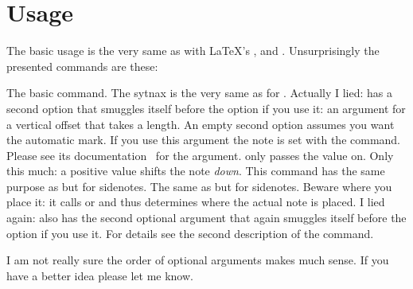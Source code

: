 \documentclass[toc=index,toc=bib,mpinclude]{cnpkgdoc}
\begin{document}
\section{Usage}
The basic usage is the very same as with \LaTeX's , 
and . Unsurprisingly the presented commands are these:
\begin{beschreibung}
 \newline
   The basic command. The sytnax is the very same as for .
 \newline
   Actually I lied:  has a second option that smuggles itself
   before the  option if you use it: an argument for a vertical offset
   that takes a length. An empty second option assumes you want the automatic
   mark. If you use this argument the note is set with the 
   command.
   Please see its documentation~\cite{pkg:marginnote} for the 
   argument. \snotez only passes the value on. Only this much: a positive value
   shifts the note \emph{down}.
 \newline
   This command has the same purpose as  but for sidenotes.
 \newline
   The same as  but for sidenotes. Beware where you place it:
   it calls  or  and thus determines where the
   actual note is placed.
 \newline
   I lied again:  also has the second optional argument
    that again smuggles itself before the  option if you
   use it. For details see the second description of the  command.
\end{beschreibung}
I am not really sure the order of optional arguments makes much sense. If you
have a better idea please let me know.
\end{document}
